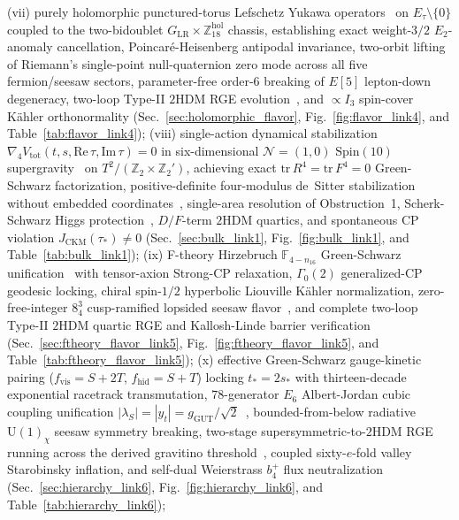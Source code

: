 \documentclass[aps,prd,twocolumn,nofootinbib,floatfix]{revtex4-2}
\begin{document}
(vii) purely holomorphic punctured-torus Lefschetz Yukawa operators~\cite{Riemann1857,Mumford1983,KaplunovskyLouis1993} on $E_\tau\setminus\{0\}$ coupled to the two-bidoublet $G_{\mathrm{LR}} \times \mathbb{Z}_{18}^{\mathrm{hol}}$ chassis, establishing exact weight-$3/2$ $E_2$-anomaly cancellation, Poincar\'e-Heisenberg antipodal invariance, two-orbit lifting of Riemann's single-point null-quaternion zero mode across all five fermion/seesaw sectors, parameter-free order-$6$ breaking of $E[5]$ lepton-down degeneracy, two-loop Type-II $2\mathrm{HDM}$ RGE evolution~\cite{MachacekVaughn1983,MachacekVaughn1984}, and $\propto I_3$ spin-cover K\"ahler orthonormality (Sec.~\ref{sec:holomorphic_flavor}, Fig.~\ref{fig:flavor_link4}, and Table~\ref{tab:flavor_link4});
(viii) single-action dynamical stabilization $\nabla_4 V_{\mathrm{tot}}(t, s, \mathrm{Re}\,\tau, \mathrm{Im}\,\tau) = 0$ in six-dimensional $\mathcal{N}=(1,0)$ $\mathrm{Spin}(10)$ supergravity~\cite{SalamSezgin1984,Sagnotti1992,AsakaBuchmullerCovi2001} on $T^2/(\mathbb{Z}_2\times\mathbb{Z}_2')$, achieving exact $\mathrm{tr}\,R^4 = \mathrm{tr}\,F^4 = 0$ Green-Schwarz factorization, positive-definite four-modulus de~Sitter stabilization without embedded coordinates~\cite{Krasnikov1987,FontIbanezLustQuevedo1990,DixonKaplunovskyLouis1991,BurgessKalloshQuevedo2003}, single-area resolution of Obstruction~1, Scherk-Schwarz Higgs protection~\cite{Antoniadis1999}, $D/F$-term $2\mathrm{HDM}$ quartics, and spontaneous CP violation $J_{\mathrm{CKM}}(\tau_*) \ne 0$ (Sec.~\ref{sec:bulk_link1}, Fig.~\ref{fig:bulk_link1}, and Table~\ref{tab:bulk_link1});
(ix) F-theory Hirzebruch $\mathbb{F}_{4-n_{16}}$ Green-Schwarz unification~\cite{MorrisonVafa1996,Sadov1996,KumarMorrisonTaylor2010} with tensor-axion Strong-CP relaxation, $\Gamma_0(2)$ generalized-CP geodesic locking, chiral spin-$1/2$ hyperbolic Liouville K\"ahler normalization, zero-free-integer $8^3_4$ cusp-ramified lopsided seesaw flavor~\cite{AltarelliFeruglio1998}, and complete two-loop Type-II $2\mathrm{HDM}$ quartic RGE and Kallosh-Linde barrier verification~\cite{ChowdhuryEberhardt2015,KalloshLinde2004} (Sec.~\ref{sec:ftheory_flavor_link5}, Fig.~\ref{fig:ftheory_flavor_link5}, and Table~\ref{tab:ftheory_flavor_link5});
(x) effective Green-Schwarz gauge-kinetic pairing ($f_{\mathrm{vis}} = S + 2T$, $f_{\mathrm{hid}} = S + T$) locking $t_* = 2s_*$ with thirteen-decade exponential racetrack transmutation, $78$-generator $E_6$ Albert-Jordan cubic coupling unification $|\lambda_S| = |y_t| = g_{\mathrm{GUT}}/\sqrt{2}$~\cite{Adams1996,EllwangerHugonieTeixeira2010}, bounded-from-below radiative $\mathrm{U}(1)_\chi$ seesaw symmetry breaking, two-stage supersymmetric-to-$2\mathrm{HDM}$ RGE running across the derived gravitino threshold~\cite{MartinVaughn1994}, coupled sixty-$e$-fold valley Starobinsky inflation, and self-dual Weierstrass $b_4^+$ flux neutralization (Sec.~\ref{sec:hierarchy_link6}, Fig.~\ref{fig:hierarchy_link6}, and Table~\ref{tab:hierarchy_link6});
\end{document}
